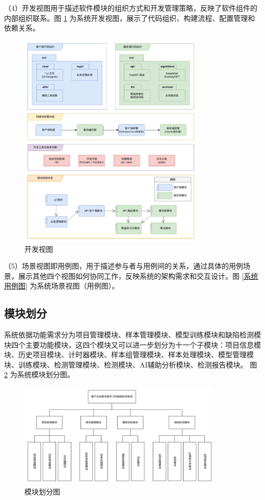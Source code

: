 \documentclass[
  ]{njuthesis}
\begin{document}
（4）开发视图用于描述软件模块的组织方式和开发管理策略，反映了软件组件的内部组织联系。图 \ref{开发视图} 为系统开发视图，展示了代码组织、构建流程、配置管理和依赖关系。

\begin{figure}[H]
    \centering
    \includegraphics[width=0.8\textwidth]{images/开发视图.png}
    \caption{开发视图}
    \label{开发视图}
\end{figure}

（5）场景视图即用例图，用于描述参与者与用例间的关系，通过具体的用例场景，展示其他四个视图如何协同工作，反映系统的架构需求和交互设计。图 \ref{系统用例图} 为系统场景视图（用例图）。

\subsection{模块划分}

系统依据功能需求分为项目管理模块、样本管理模块、模型训练模块和缺陷检测模块四个主要功能模块，这四个模块又可以进一步划分为十一个子模块：项目信息模块、历史项目模块、计时器模块、样本组管理模块、样本处理模块、模型管理模块、训练模块、检测管理模块、检测模块、AI辅助分析模块、检测报告模块。
图 \ref{模块划分图} 为系统模块划分图。

\begin{figure}[htb]
    \centering
    \includegraphics[width=0.88\textwidth]{images/模块划分图.png}
    \caption{模块划分图}
    \label{模块划分图}
\end{figure}
\end{document}

